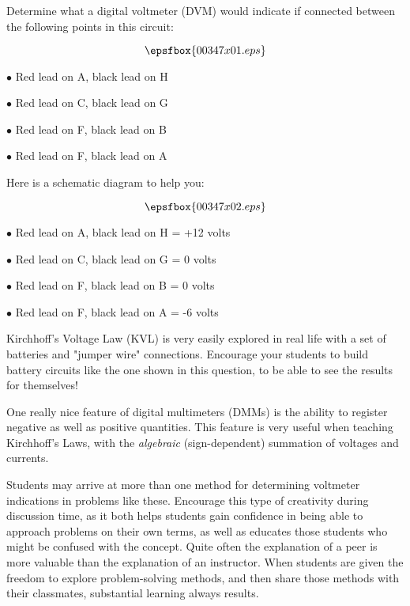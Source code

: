 

Determine what a digital voltmeter (DVM) would indicate if connected between the following points in this circuit:

$$\epsfbox{00347x01.eps}$$

\medskip
\item{$\bullet$} Red lead on A, black lead on H
\item{$\bullet$} Red lead on C, black lead on G
\item{$\bullet$} Red lead on F, black lead on B
\item{$\bullet$} Red lead on F, black lead on A 
\medskip







Here is a schematic diagram to help you:

$$\epsfbox{00347x02.eps}$$

\medskip
\item{$\bullet$} Red lead on A, black lead on H = +12 volts
\item{$\bullet$} Red lead on C, black lead on G = 0 volts
\item{$\bullet$} Red lead on F, black lead on B = 0 volts
\item{$\bullet$} Red lead on F, black lead on A = -6 volts
\medskip







Kirchhoff's Voltage Law (KVL) is very easily explored in real life with a set of batteries and "jumper wire" connections.  Encourage your students to build battery circuits like the one shown in this question, to be able to see the results for themselves!

One really nice feature of digital multimeters (DMMs) is the ability to register negative as well as positive quantities.  This feature is very useful when teaching Kirchhoff's Laws, with the {\it algebraic} (sign-dependent) summation of voltages and currents.

Students may arrive at more than one method for determining voltmeter indications in problems like these.  Encourage this type of creativity during discussion time, as it both helps students gain confidence in being able to approach problems on their own terms, as well as educates those students who might be confused with the concept.  Quite often the explanation of a peer is more valuable than the explanation of an instructor.  When students are given the freedom to explore problem-solving methods, and then share those methods with their classmates, substantial learning always results.




